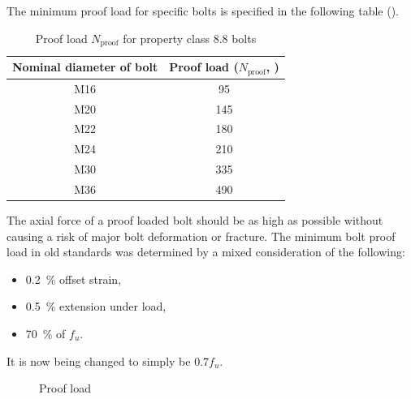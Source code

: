 The minimum proof load for specific bolts is specified in the following table ().
\begin{table}[H]\centering\footnotesize\caption{Proof load $N_\text{proof}$ for property class 8.8 bolts}\label{tab:proof_load}
\begin{tabular}{cc}
	\toprule
	Nominal diameter of bolt & Proof load ($N_\text{proof}$, \si{\kn}) \\ \midrule
	          M16            &                     95                      \\
	          M20            &                     145                     \\
	          M22            &                     180                     \\
	          M24            &                     210                     \\
	          M30            &                     335                     \\
	          M36            &                     490                     \\ \bottomrule
\end{tabular}
\end{table}
The axial force of a proof loaded bolt should be as high as possible without causing a risk of major bolt deformation or fracture.
The minimum bolt proof load in old standards was determined by a mixed consideration of the following:
\begin{itemize}
\item \SI{0.2}{\percent} offset strain,
\item \SI{0.5}{\percent} extension under load,
\item \SI{70}{\percent} of $f_u$.
\end{itemize}
It is now being changed to simply be $0.7f_u$.
\begin{figure}[H]
\centering
\caption{Proof load}
\end{figure}
